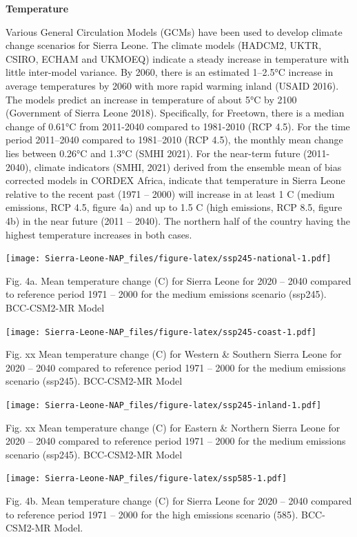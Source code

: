 \documentclass[
]{book}
\begin{document}
\textbf{Temperature}

Various General Circulation Models (GCMs) have been used to develop climate change scenarios for Sierra Leone. The climate models (HADCM2, UKTR, CSIRO, ECHAM and UKMOEQ) indicate a steady increase in temperature with little inter-model variance. By 2060, there is an estimated 1--2.5°C increase in average temperatures by 2060 with more rapid warming inland (USAID 2016). The models predict an increase in temperature of about 5°C by 2100 (Government of Sierra Leone 2018). Specifically, for Freetown, there is a median change of 0.61°C from 2011-2040 compared to 1981-2010 (RCP 4.5). For the time period 2011--2040 compared to 1981--2010 (RCP 4.5), the monthly mean change lies between 0.26°C and 1.3°C (SMHI 2021).
For the near-term future (2011-2040), climate indicators (SMHI, 2021) derived from the ensemble mean of bias corrected models in CORDEX Africa, indicate that temperature in Sierra Leone relative to the recent past (1971 -- 2000) will increase in at least 1 C (medium emissions, RCP 4.5, figure 4a) and up to 1.5 C (high emissions, RCP 8.5, figure 4b) in the near future (2011 -- 2040). The northern half of the country having the highest temperature increases in both cases.

\texttt{[image: Sierra-Leone-NAP\_files/figure-latex/ssp245-national-1.pdf]}

Fig. 4a. Mean temperature change (C) for Sierra Leone for 2020 -- 2040 compared to reference period 1971 -- 2000 for the medium emissions scenario (ssp245). BCC-CSM2-MR Model

\texttt{[image: Sierra-Leone-NAP\_files/figure-latex/ssp245-coast-1.pdf]}

Fig. xx Mean temperature change (C) for Western \& Southern Sierra Leone for 2020 -- 2040 compared to reference period 1971 -- 2000 for the medium emissions scenario (ssp245). BCC-CSM2-MR Model

\texttt{[image: Sierra-Leone-NAP\_files/figure-latex/ssp245-inland-1.pdf]}

Fig. xx Mean temperature change (C) for Eastern \& Northern Sierra Leone for 2020 -- 2040 compared to reference period 1971 -- 2000 for the medium emissions scenario (ssp245). BCC-CSM2-MR Model

\texttt{[image: Sierra-Leone-NAP\_files/figure-latex/ssp585-1.pdf]}

Fig. 4b. Mean temperature change (C) for Sierra Leone for 2020 -- 2040 compared to reference period 1971 -- 2000 for the high emissions scenario (585). BCC-CSM2-MR Model.
\end{document}
